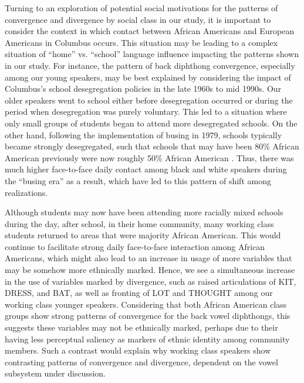 \documentclass[output=paper,colorlinks,citecolor=brown]{langscibook}
\begin{document}
Turning to an exploration of potential social motivations for the patterns of convergence and divergence by social class in our study, it is important to consider the context in which contact between African Americans and European Americans in Columbus occurs. This situation may be leading to a complex situation of “home” vs. “school” language influence impacting the patterns shown in our study. For instance, the pattern of back diphthong convergence, especially among our young speakers, may be best explained by considering the impact of Columbus’s school desegregation policies in the late 1960s to mid 1990s. Our older speakers went to school either before desegregation occurred or during the period when desegregation was purely voluntary. This led to a situation where only small groups of students began to attend more desegregated schools. On the other hand, following the implementation of busing in 1979, schools typically became strongly desegregated, such that schools that may have been 80\% African American previously were now roughly 50\% African American \citep{foster1997september}. Thus, there was much higher face-to-face daily contact among black and white speakers during the “busing era” as a result, which have led to this pattern of shift among realizations.

Although students may now have been attending more racially mixed schools during the day, after school, in their home community, many working class students returned to areas that were majority African American. This would continue to facilitate strong daily face-to-face interaction among African Americans, which might also lead to an increase in usage of more variables that may be somehow more ethnically marked. Hence, we see a simultaneous increase in the use of variables marked by divergence, such as raised articulations of KIT, DRESS, and BAT, as well as fronting of LOT and THOUGHT among our working class younger speakers. Considering that both African American class groups show strong patterns of convergence for the back vowel diphthongs, this suggests these variables may not be ethnically marked, perhaps due to their having less perceptual saliency as markers of ethnic identity among community members. Such a contrast would explain why working class speakers show contrasting patterns of convergence and divergence, dependent on the vowel subsystem under discussion.
\end{document}
